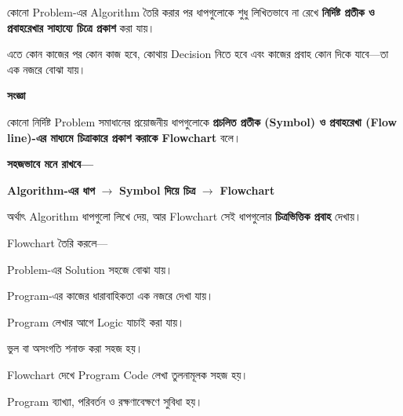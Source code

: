 
কোনো Problem-এর Algorithm তৈরি করার পর ধাপগুলোকে শুধু লিখিতভাবে
না রেখে \textbf{নির্দিষ্ট প্রতীক ও প্রবাহরেখার সাহায্যে চিত্রে প্রকাশ}
করা যায়।

এতে কোন কাজের পর কোন কাজ হবে, কোথায় Decision নিতে হবে এবং
কাজের প্রবাহ কোন দিকে যাবে—তা এক নজরে বোঝা যায়।



\begin{definitionbox}

\textbf{\color{darkTeal}সংজ্ঞা}

কোনো নির্দিষ্ট Problem সমাধানের প্রয়োজনীয় ধাপগুলোকে
\textbf{প্রচলিত প্রতীক (Symbol) ও প্রবাহরেখা (Flow line)-এর মাধ্যমে
চিত্রাকারে প্রকাশ করাকে Flowchart} বলে।

\end{definitionbox}

\textbf{সহজভাবে মনে রাখবে—}

\begin{center}

\textbf{Algorithm-এর ধাপ}
\(\longrightarrow\)
\textbf{Symbol দিয়ে চিত্র}
\(\longrightarrow\)
\textbf{Flowchart}

\end{center}

অর্থাৎ Algorithm ধাপগুলো লিখে দেয়, আর Flowchart সেই ধাপগুলোর
\textbf{চিত্রভিত্তিক প্রবাহ} দেখায়।



Flowchart তৈরি করলে—

\begin{compacttwocolpoints}

\item Problem-এর Solution সহজে বোঝা যায়।

\item Program-এর কাজের ধারাবাহিকতা এক নজরে দেখা যায়।

\item Program লেখার আগে Logic যাচাই করা যায়।

\item ভুল বা অসংগতি শনাক্ত করা সহজ হয়।

\item Flowchart দেখে Program Code লেখা তুলনামূলক সহজ হয়।

\item Program ব্যাখ্যা, পরিবর্তন ও রক্ষণাবেক্ষণে সুবিধা হয়।

\end{compacttwocolpoints}


